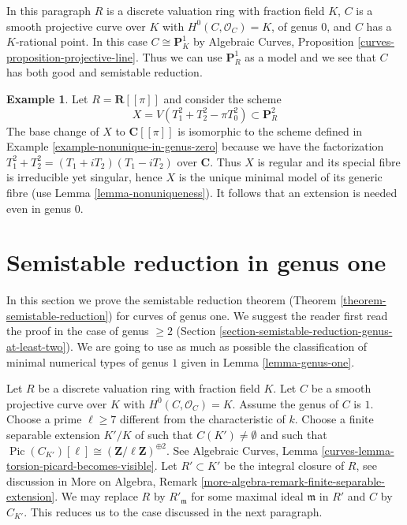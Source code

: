 \documentclass{stacks-project}
\theoremstyle{plain}
\theoremstyle{definition}
\newtheorem{example}[subsection]{Example}
\theoremstyle{remark}
\numberwithin{equation}{subsection}
\def\Pic{\mathop{\mathrm{Pic}}\nolimits}
\begin{document}
\medskip\noindent
In this paragraph $R$ is a discrete valuation ring with fraction field $K$,
$C$ is a smooth projective curve over $K$ with $H^0(C, \mathcal{O}_C) = K$,
of genus $0$, and $C$ has a $K$-rational point. In this case
$C \cong \mathbf{P}^1_K$ by
Algebraic Curves, Proposition \ref{curves-proposition-projective-line}.
Thus we can use $\mathbf{P}^1_R$ as a model and we see that
$C$ has both good and semistable reduction.

\begin{example}
\label{example-extension-necessary-genus-zero}
Let $R = \mathbf{R}[[\pi]]$ and consider the scheme
$$
X = V(T_1^2 + T_2^2 - \pi T_0^2) \subset \mathbf{P}^2_R
$$
The base change of $X$ to $\mathbf{C}[[\pi]]$ is isomorphic
to the scheme defined in Example \ref{example-nonunique-in-genus-zero}
because we have the factorization $T_1^2 + T_2^2 = (T_1 + iT_2)(T_1 - iT_2)$
over $\mathbf{C}$.
Thus $X$ is regular and its special fibre is irreducible yet singular,
hence $X$ is the unique minimal model of its generic fibre
(use Lemma \ref{lemma-nonuniqueness}).
It follows that an extension is needed even in genus $0$.
\end{example}



\section{Semistable reduction in genus one}
\label{section-semistable-reduction-genus-one}

\noindent
In this section we prove the semistable reduction theorem
(Theorem \ref{theorem-semistable-reduction}) for curves of genus one.
We suggest the reader first read the proof in the case of genus $\geq 2$
(Section \ref{section-semistable-reduction-genus-at-least-two}).
We are going to use as much as possible the classification of
minimal numerical types of genus $1$ given in
Lemma \ref{lemma-genus-one}.

\medskip\noindent
Let $R$ be a discrete valuation ring with fraction field $K$.
Let $C$ be a smooth projective curve over $K$ with $H^0(C, \mathcal{O}_C) = K$.
Assume the genus of $C$ is $1$.
Choose a prime $\ell \geq 7$ different from the characteristic of $k$.
Choose a finite separable extension $K'/K$ of
such that $C(K') \not = \emptyset$ and such that
$\Pic(C_{K'})[\ell] \cong (\mathbf{Z}/\ell \mathbf{Z})^{\oplus 2}$.
See
Algebraic Curves, Lemma \ref{curves-lemma-torsion-picard-becomes-visible}.
Let $R' \subset K'$ be the integral closure of $R$, see
discussion in More on Algebra, Remark
\ref{more-algebra-remark-finite-separable-extension}.
We may replace $R$ by $R'_{\mathfrak m}$ for some maximal ideal
$\mathfrak m$ in $R'$ and $C$ by $C_{K'}$. This
reduces us to the case discussed in the next paragraph.
\end{document}
